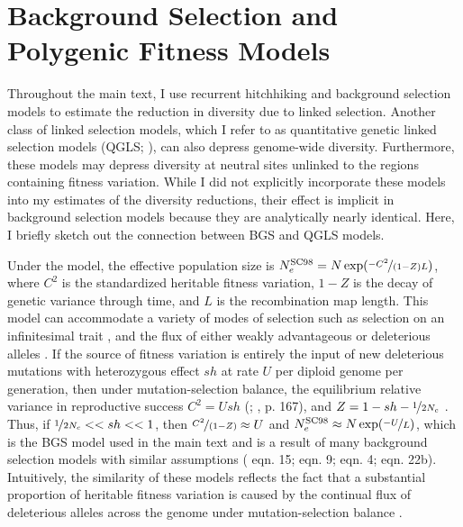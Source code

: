 \documentclass[11pt]{article}
\begin{document}


\section{Background Selection and Polygenic Fitness Models}
\label{app:bgs}

Throughout the main text, I use recurrent hitchhiking and background selection
models to estimate the reduction in diversity due to linked selection. Another
class of linked selection models, which I refer to as quantitative genetic
linked selection models (QGLS;
\cite{Robertson1961-ho,Santiago1995-hx,Santiago1998-bs}), can also depress
genome-wide diversity. Furthermore, these models may depress diversity at neutral sites unlinked to the regions containing fitness variation.  While I
did not explicitly incorporate these models into my estimates of the diversity
reductions, their effect is implicit in background selection models because
they are analytically nearly identical. Here, I briefly sketch out the
connection between BGS and QGLS models.

Under the \textcite{Santiago1998-bs} model, the effective population size is
$N_e^\text{SC98} = N \exp(\nicefrac{-C^2}{(1-Z)L})$, where $C^2$ is the
standardized heritable fitness variation, $1-Z$ is the decay of genetic
variance through time, and $L$ is the recombination map length. This model can
accommodate a variety of modes of selection such as selection on an
infinitesimal trait \parencite[p.  1016]{Santiago1995-hx}, and the flux of
either weakly advantageous or deleterious alleles \parencite[p.
2109]{Santiago1998-bs}. If the source of fitness variation is entirely the
input of new deleterious mutations with heterozygous effect $s h$ at rate $U$
per diploid genome per generation, then under mutation-selection balance, the
equilibrium relative variance in reproductive success $C^2 = U sh$
(\cite{Crow1970-wm}; \cite{Caballero2020-wm}, p. 167), and $Z = 1 - sh -
\nicefrac{1}{2N_c}$ \parencite{Santiago1998-bs}. Thus, if $\nicefrac{1}{2N_c}
<< sh << 1$, then $\nicefrac{C^2}{(1-Z)} \approx U$ and $N_e^\text{SC98}
\approx N \exp(\nicefrac{-U}{L})$, which is the BGS model used in the main text
and is a result of many background selection models with similar assumptions
(\cite{Hudson1994-oh} eqn.  15; \cite{Hudson1995-xc} eqn.  9;
\cite{Nordborg1996-nq} eqn. 4; \cite{Barton1995-pm} eqn. 22b). Intuitively, the
similarity of these models reflects the fact that a substantial proportion of
heritable fitness variation is caused by the continual flux of deleterious
alleles across the genome under mutation-selection balance
\parencite{Charlesworth2015-am,Charlesworth2000-km}. 
\end{document}
